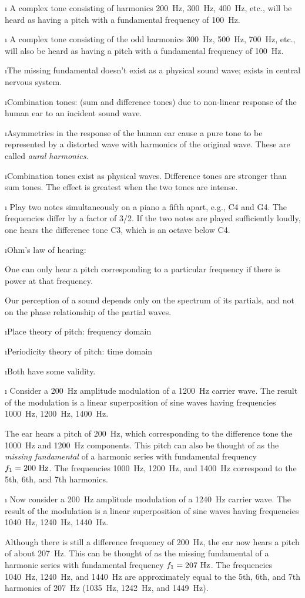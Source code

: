 \i \ex
A complex tone consisting of harmonics
200~Hz, 300~Hz, 400~Hz, etc., will be heard
as having a pitch with a fundamental frequency of 100~Hz.

\i \ex
A complex tone consisting of the odd harmonics
300~Hz, 500~Hz, 700~Hz, etc., will also be heard
as having a pitch with a fundamental frequency of 100~Hz.

\i The missing fundamental doesn't exist as a 
physical sound wave; 
exists in central nervous system.

\i Combination tones: 
(sum and difference tones)
due to non-linear response of the human ear to 
an incident sound wave.

\i Asymmetries in the response of the 
human ear cause a pure tone to be represented
by a distorted wave with harmonics of the original wave.
These are called {\em aural harmonics}.

\i Combination tones exist as physical waves.
Difference tones are stronger than sum tones.
The effect is greatest when the two tones are
intense.

\i \ex
Play two notes simultaneously on a piano 
a fifth apart, e.g., C4 and G4.
The frequencies differ by a factor of 3/2.
If the two notes are played sufficiently loudly,
one hears the difference tone C3, which is an octave 
below C4.

\i Ohm's law of hearing:

One can only hear a pitch corresponding to 
a particular frequency if there is power at
that frequency.

Our perception of a sound depends only on
the spectrum of its partials, and 
not on the phase relationship of the partial waves.

\i Place theory of pitch:
frequency domain

\i Periodicity theory of pitch:
time domain

\i Both have some validity.

\i \ex
Consider a 200~Hz amplitude modulation of a 1200~Hz
carrier wave.
The result of the modulation is a linear superposition 
of sine waves having frequencies 1000~Hz, 1200~Hz, 1400~Hz.

The ear hears a pitch of 200~Hz, which corresponding 
to the difference tone the 1000~Hz and 1200~Hz components.
This pitch can also be thought of as the {\em missing fundamental} 
of a harmonic series with fundamental frequency $f_1=200~{\rm Hz}$.
The frequencies 1000~Hz, 1200~Hz, and 1400~Hz correspond
to the 5th, 6th, and 7th harmonics.

\i \ex
Now consider
a 200~Hz amplitude modulation of a 1240~Hz
carrier wave.
The result of the modulation is a linear superposition 
of sine waves having frequencies 1040~Hz, 1240~Hz, 1440~Hz.

Although there is still a difference frequency of 200~Hz,
the ear now hears a pitch of about 207~Hz.
This can be thought of as the missing fundamental of a
harmonic series with fundamental frequency $f_1=207~{\rm Hz}$.
The frequencies 1040~Hz, 1240~Hz, and 1440~Hz are
approximately equal to the 5th, 6th, and 7th harmonics 
of 207~Hz (1035~Hz, 1242~Hz, and 1449~Hz).

\ei

